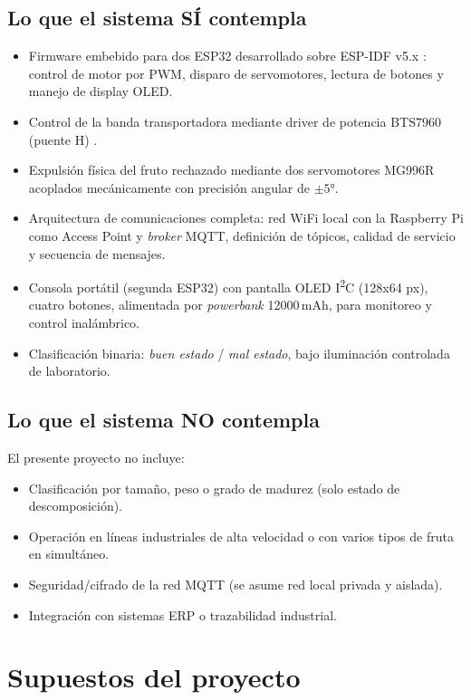 \documentclass[12pt]{catolica_proyectos}
\begin{document}
\subsection{Lo que el sistema SÍ contempla}
\begin{itemize}
  \item Firmware embebido para dos ESP32 desarrollado sobre ESP-IDF v5.x \cite{espressif2024idf}: control de motor por PWM, disparo de servomotores, lectura de botones y manejo de display OLED.
  \item Control de la banda transportadora mediante driver de potencia BTS7960 (puente H) \cite{infineon2013bts7960}.
  \item Expulsión física del fruto rechazado mediante dos servomotores MG996R acoplados mecánicamente con precisión angular de $\pm 5°$.
  \item Arquitectura de comunicaciones completa: red WiFi local con la Raspberry Pi como Access Point y \emph{broker} MQTT, definición de tópicos, calidad de servicio y secuencia de mensajes.
  \item Consola portátil (segunda ESP32) con pantalla OLED I\textsuperscript{2}C (128x64 px), cuatro botones, alimentada por \emph{powerbank} 12000\,mAh, para monitoreo y control inalámbrico.
  \item Clasificación binaria: \emph{buen estado} / \emph{mal estado}, bajo iluminación controlada de laboratorio.
\end{itemize}

\subsection{Lo que el sistema NO contempla}
El presente proyecto no incluye:
\begin{itemize}
  \item Clasificación por tamaño, peso o grado de madurez (solo estado de descomposición).
  \item Operación en líneas industriales de alta velocidad o con varios tipos de fruta en simultáneo.
  \item Seguridad/cifrado de la red MQTT (se asume red local privada y aislada).
  \item Integración con sistemas ERP o trazabilidad industrial.
\end{itemize}

\section{Supuestos del proyecto}
\end{document}
